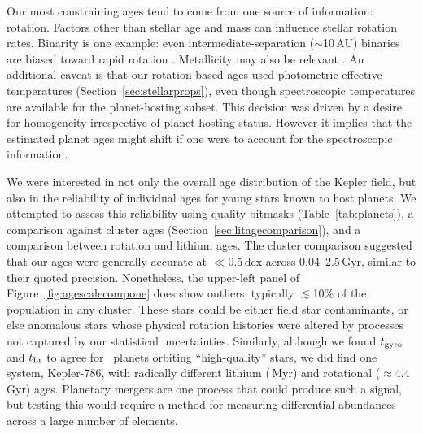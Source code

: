 \documentclass[11pt,twocolumn,tighten,linenumbers,trackchanges]{aastex63}
\begin{document}
Our most constraining ages tend to come from one source of
information: rotation.  Factors other than stellar age and mass can
influence stellar rotation rates.  Binarity is one example: even
intermediate-separation ($\sim$10\,AU) binaries are biased toward
rapid rotation \citep[e.g.][and many studies thereafter]{Meibom_2007}.
Metallicity may also be relevant
\citep{2020MNRAS.499.3481A,2024arXiv240500779S}.  An additional caveat
is that our rotation-based ages used photometric effective
temperatures (Section~\ref{sec:stellarprops}), even though
spectroscopic temperatures are available for the planet-hosting
subset.  This decision was driven by a desire for homogeneity 
irrespective of planet-hosting status.  However it implies that the
estimated planet ages might shift if one were to account for the
spectroscopic information.

We were interested in not only the overall age distribution of the
Kepler field, but also in the reliability of individual ages for young
stars known to host planets.  We attempted to assess this reliability using
quality bitmasks (Table~\ref{tab:planets}), a comparison against 
cluster ages (Section~\ref{sec:litagecomparison}), and a comparison
between rotation and lithium ages.  The cluster comparison
suggested that our ages were generally accurate at $\ll$0.5\,dex
across 0.04--2.5\,Gyr, similar to their quoted precision.
Nonetheless, the upper-left panel of Figure~\ref{fig:agescalecompone}
does show outliers, typically $\lesssim$10\% of the population
in any cluster.  These stars could be either field star contaminants,
or else anomalous stars whose physical rotation histories were altered
by processes not captured by our statistical uncertainties.
Similarly, although we found $t_{\rm gyro}$ and $t_{\rm Li}$ to agree
for \ltonegyrhighqconfirmedtwosided\ planets orbiting ``high-quality''
stars, we did find one system, Kepler-786, with radically different
lithium (\kepseveneightsix\,Myr) and rotational
($\approx$4.4\,Gyr) ages.  Planetary mergers
are one process that could produce such a signal, but
testing this would require a method for measuring differential abundances
across a large number of elements.

\end{document}
